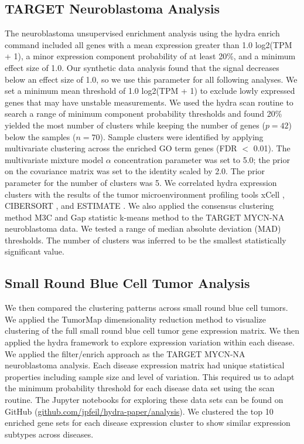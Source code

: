 \documentclass[10pt,letterpaper]{article}
\begin{document}
\subsection{TARGET Neuroblastoma Analysis}
The neuroblastoma unsupervised enrichment analysis using the hydra enrich command included all genes with a mean expression greater than 1.0 log2(TPM + 1), a minor expression component probability of at least 20\%, and a minimum effect size of 1.0. Our synthetic data analysis found that the signal decreases below an effect size of 1.0, so we use this parameter for all following analyses. We set a minimum mean threshold of 1.0 log2(TPM + 1) to exclude lowly expressed genes that may have unstable measurements. We used the hydra scan routine to search a range of minimum component probability thresholds and found 20\% yielded the most number of clusters while keeping the number of genes ($p=42$) below the samples ($n=70$). Sample clusters were identified by applying multivariate clustering across the enriched GO term genes (FDR $<$ 0.01). The multivariate mixture model $\alpha$ concentration parameter was set to 5.0; the prior on the covariance matrix was set to the identity scaled by 2.0. The prior parameter for the number of clusters was 5. We correlated hydra expression clusters with the results of the tumor microenvironment profiling tools xCell \cite{aranXCellDigitallyPortraying2017}, CIBERSORT \cite{newmanRobustEnumerationCell2015}, and ESTIMATE \cite{yoshiharaInferringTumourPurity2013}. We also applied the consensus clustering method M3C \cite{johnM3CMonteCarlo2018} and Gap statistic k-means method \cite{tibshirani2001estimating} to the TARGET MYCN-NA neuroblastoma data. We tested a range of median absolute deviation (MAD) thresholds. The number of clusters was inferred to be the smallest statistically significant value.

\subsection{Small Round Blue Cell Tumor Analysis}
We then compared the clustering patterns across small round blue cell tumors. We applied the TumorMap dimensionality reduction method \cite{newtonTumorMapExploringMolecular2017} to visualize clustering of the full small round blue cell tumor gene expression matrix. We then applied the hydra framework to explore expression variation within each disease. We applied the filter/enrich approach as the TARGET MYCN-NA neuroblastoma analysis. Each disease expression matrix had unique statistical properties including sample size and level of variation. This required us to adapt the minimum probability threshold for each disease data set using the scan routine. The Jupyter notebooks for exploring these data sets can be found on GitHub (\url{github.com/jpfeil/hydra-paper/analysis}). We clustered the top 10 enriched gene sets for each disease expression cluster to show similar expression subtypes across diseases. 
\end{document}
